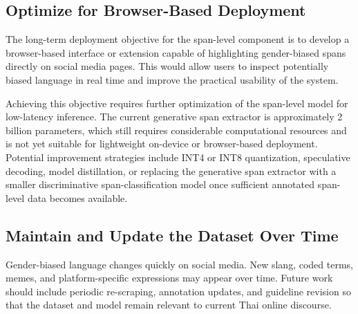 \documentclass[12pt,oneside,openright,a4paper]{cpe-english-project}
\begin{document}
\subsection{Optimize for Browser-Based Deployment}

The long-term deployment objective for the span-level component is to develop a browser-based interface or extension capable of highlighting gender-biased spans directly on social media pages. This would allow users to inspect potentially biased language in real time and improve the practical usability of the system.

Achieving this objective requires further optimization of the span-level model for low-latency inference. The current generative span extractor is approximately 2 billion parameters, which still requires considerable computational resources and is not yet suitable for lightweight on-device or browser-based deployment. Potential improvement strategies include INT4 or INT8 quantization, speculative decoding, model distillation, or replacing the generative span extractor with a smaller discriminative span-classification model once sufficient annotated span-level data becomes available.

\subsection{Maintain and Update the Dataset Over Time}

Gender-biased language changes quickly on social media. New slang, coded terms, memes, and platform-specific expressions may appear over time. Future work should include periodic re-scraping, annotation updates, and guideline revision so that the dataset and model remain relevant to current Thai online discourse.


\makeatletter
\g@addto@macro{\UrlBreaks}{\UrlOrds}
\makeatother
%
\end{document}
